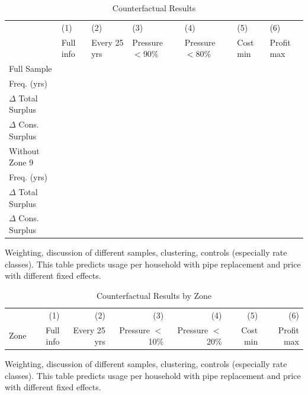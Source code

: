 \documentclass[12pt,table]{article}
\begin{document}
\begin{table}[h!] 
\centering
\caption{Counterfactual Results}\label{table:georesults}
\vspace{-2mm} 
\begin{threeparttable}
\begin{tabular}{@{}l*{1}{FFFFFF}@{}}
\toprule
	  & (1) & (2) & (3) & (4) & (5) & (6) \\
  & Full info & Every 25 yrs & Pressure $<$90\% & Pressure $<$80\% & Cost min & Profit max \\
\midrule
Full Sample \\[.2em]
\hspace{1em}Freq. (yrs)  \\[.3em]
\hspace{1em}$\Delta$ Total Surplus  \\[.3em]
\hspace{1em}$\Delta$ Cons. Surplus  \\[.5em]
Without Zone 9 \\[.2em]
\hspace{1em}Freq. (yrs)  \\[.3em]
\hspace{1em}$\Delta$ Total Surplus  \\[.3em]
\hspace{1em}$\Delta$ Cons. Surplus  \\
\bottomrule
\end{tabular}
\begin{tablenotes}
\footnotesize
\item Weighting, discussion of different samples, clustering, controls (especially rate classes).  This table predicts usage per household with pipe replacement and price with different fixed effects.  
\end{tablenotes}
\end{threeparttable}
\end{table}

\begin{table}[h!] 
\centering
\caption{Counterfactual Results by Zone}\label{table:georesultsbyzone}
\vspace{-2mm} 
\begin{threeparttable}
\begin{tabular}{@{}l*{1}{DDDDDD}@{}}
\toprule
	  & (1) & (2) & (3) & (4) & (5) & (6) \\
 Zone & Full info & Every 25 yrs & Pressure $<$10\% & Pressure $<$20\% & Cost min & Profit max \\
\midrule

\bottomrule
\end{tabular}
\begin{tablenotes}
\footnotesize
\item Weighting, discussion of different samples, clustering, controls (especially rate classes).  This table predicts usage per household with pipe replacement and price with different fixed effects.  
\end{tablenotes}
\end{threeparttable}
\end{table}
\end{document}
